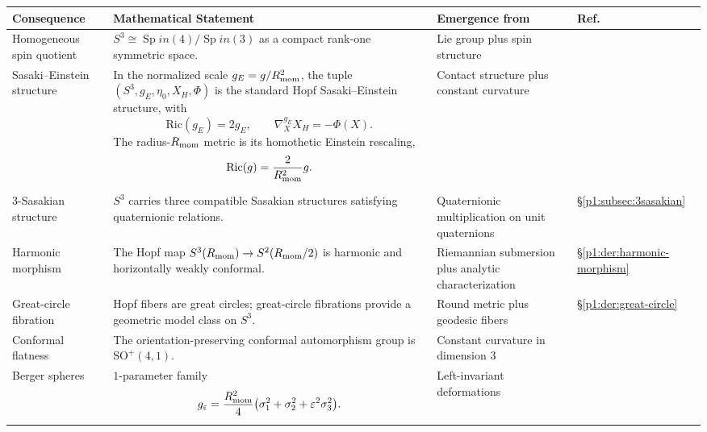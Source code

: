 \documentclass[11pt]{article}
\begin{document}
\begin{table}[p]
\centering
\footnotesize
\begingroup
\renewcommand{\arraystretch}{1.3}
\setlength{\tabcolsep}{2.5pt}

\begin{tabular}{|
  L{3.0cm}|
  L{\dimexpr\linewidth-3.0cm-4.0cm-1.0cm-8\arrayrulewidth\relax}|
  L{4.0cm}|
  C{1.0cm}|
}
\hline
\textbf{Consequence} & \textbf{Mathematical Statement} & \textbf{Emergence from} & \textbf{Ref.} \\
\hline

Homogeneous spin quotient
& \(S^3 \cong \operatorname{Sp}in(4)/\operatorname{Sp}in(3)\) as a compact rank-one symmetric space.
& Lie group plus spin structure
& \cite{helgason1984groups} \\
\hline

Sasaki--Einstein structure
& In the normalized scale \(g_E=g/R_{\mathrm{mom}}^2\), the tuple
  \((S^3,g_E,\eta_0,X_H,\Phi)\) is the standard Hopf
  Sasaki--\allowbreak Einstein structure, with
  \[
    \mathrm{Ric}(g_E)=2g_E,
    \qquad
    \nabla^{g_E}_X X_H=-\Phi(X).
  \]
  The radius-\(R_{\mathrm{mom}}\) metric is its homothetic Einstein rescaling,
  \[
    \mathrm{Ric}(g)=\frac{2}{R_{\mathrm{mom}}^2}g.
  \]
& Contact structure plus constant curvature
& \cite{boyer2008sasakian} \\
\hline

3-Sasakian structure
& \(S^3\) carries three compatible Sasakian structures satisfying quaternionic relations.
& Quaternionic multiplication on unit quaternions
& \S\ref{p1:subsec:3sasakian} \\
\hline

Harmonic morphism
& The Hopf map \(S^3(R_{\mathrm{mom}})\to S^2(R_{\mathrm{mom}}/2)\) is harmonic and horizontally weakly conformal.
& Riemannian submersion plus analytic characterization
& \S\ref{p1:der:harmonic-morphism} \\
\hline

Great-circle fibration
& Hopf fibers are great circles; great-circle fibrations provide a geometric model class on \(S^3\).
& Round metric plus geodesic fibers
& \S\ref{p1:der:great-circle} \\
\hline

Conformal flatness
& The orientation-preserving conformal automorphism group is \(\mathrm{SO}^+(4,1)\).
& Constant curvature in dimension \(3\)
& \cite{kuiper1949conformally} \\
\hline

Berger spheres
& \(1\)-parameter family
  \[
    g_\varepsilon
    =
    \frac{R_{\mathrm{mom}}^2}{4}
    \bigl(\sigma_1^2+\sigma_2^2+\varepsilon^2\sigma_3^2\bigr).
  \]
& Left-invariant deformations
& \cite{berger1960spectre} \\
\hline


\end{tabular}
\end{table}
\end{document}
